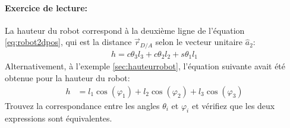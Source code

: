 \begin{example}
\paragraph{Exercice de lecture:}
La hauteur du robot correspond à la deuxième ligne de l'équation \eqref{eq:robot2dpos}, qui est la distance $\vec{r}_{D/A}$ selon le vecteur unitaire $\hat{a}_2$: 
\begin{align}
h = c\theta_3 l_3 + c\theta_2 l_2  + s\theta_1 l_1  
\end{align} 
Alternativement, à l'exemple \ref{sec:hauteurrobot}, l'équation suivante avait été obtenue pour la hauteur du robot:
\begin{align}
h &= l_1 \cos (\varphi_1) + l_2 \cos (\varphi_2) + l_3 \cos (\varphi_3)
\end{align} 
Trouvez la correspondance entre les angles $\theta_i$ et $\varphi_i$ et vérifiez que les deux expressions sont équivalentes.

\end{example}

